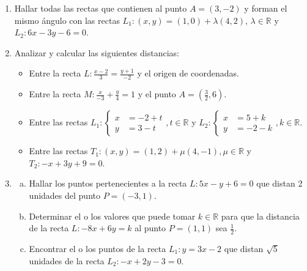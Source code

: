 \documentclass[11pt]{article}
\begin{document}
\begin{enumerate}[\hspace{-7mm}$1)$]
\item Hallar todas las rectas que contienen al punto $A = (3,-2)$ y forman el mismo ángulo con las rectas $L_1 : (x, y) = (1, 0) + \lambda(4, 2)$, $\lambda \in \mathbb{R}$ y $L_2 : 6x - 3y - 6 = 0$.










\item Analizar y calcular las siguientes distancias:

\begin{itemize}
    \item[(a)] Entre la recta $L : \frac{x - 2}{3} = \frac{y + 1}{-2}$ y el origen de coordenadas.
    \item[(b)] Entre la recta $M : \frac{x}{-3} + \frac{y}{4} = 1$ y el punto $A = \left(\frac{3}{2}, 6\right)$.
    \item[(c)] Entre las rectas $L_1 : \begin{cases} x &= -2 + t \\ y &= 3 - t \end{cases}, t \in \mathbb{R}$ y $L_2 : \begin{cases} x &= 5 + k \\ y &= -2 - k \end{cases}, k \in \mathbb{R}$.
    \item[(d)] Entre las rectas $T_1 : (x, y) = (1, 2) + \mu(4, -1), \mu \in \mathbb{R}$ y $T_2 : -x + 3y + 9 = 0$.
\end{itemize}










\item 
\begin{enumerate}[(a)]
    \item Hallar los puntos pertenecientes a la recta $L : 5x - y + 6 = 0$ que distan 2 unidades del punto $P = (-3, 1)$.
    \item  Determinar el o los valores que puede tomar $k \in \mathbb{R}$ para que la distancia de la recta $L : -8x + 6y = k$ al punto $P = (1, 1)$ sea $\frac{1}{2}$.
    \item Encontrar el o los puntos de la recta $L_1 : y = 3x - 2$ que distan $\sqrt{5}$ unidades de la recta $L_2 : -x + 2y - 3 = 0$.
\end{enumerate}

















\end{enumerate}
\end{document}
